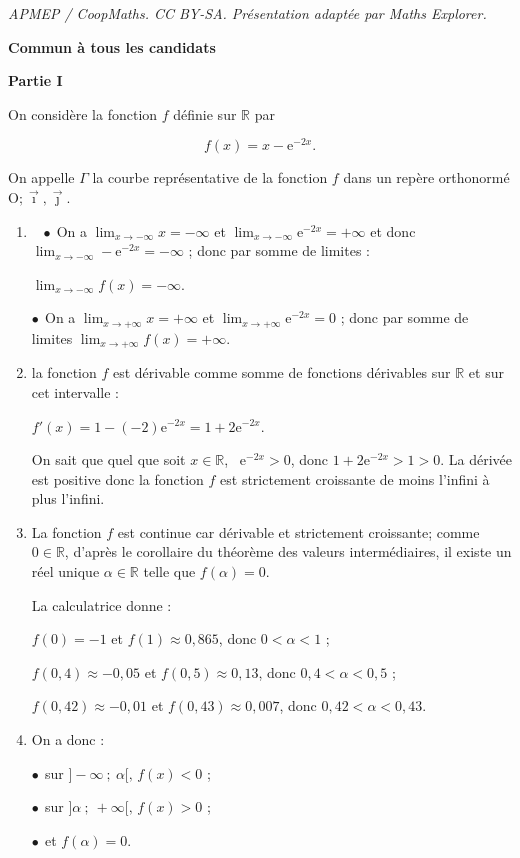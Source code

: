 \documentclass[10pt]{article}
\providecommand{\R}{\mathbb{R}}
\providecommand{\Oij}{\(\mathrm{O};\vec{\imath},\vec{\jmath}\)}
\begin{document}
\noindent\textit{APMEP / CoopMaths. CC BY-SA. Présentation adaptée par Maths Explorer.}\par\medskip
\textbf{Commun à tous les candidats}

\medskip

\begin{center}\textbf{Partie I}\end{center}

On considère la fonction $f$ définie sur $\R$ par 

\[f(x) = x - \text{e}^{-2x}.\]

On appelle $\Gamma$ la courbe représentative de la fonction $f$ dans un repère orthonormé \Oij.

\medskip

\begin{enumerate}
\item ~
$\bullet~~$On a $\displaystyle\lim_{x \to - \infty} x = - \infty$ et $\displaystyle\lim_{x \to - \infty}\text{e}^{-2x} = + \infty$ et donc $\displaystyle\lim_{x \to - \infty}-\text{e}^{-2x} = - \infty$ ; donc par somme de limites :

$\displaystyle\lim_{x \to - \infty}f(x) = - \infty$.

$\bullet~~$On a $\displaystyle\lim_{x \to + \infty} x  = + \infty$ et $\displaystyle\lim_{x \to + \infty}\text{e}^{-2x} = 0$ ; donc par somme de limites  $\displaystyle\lim_{x \to + \infty}f(x) = + \infty$.
\item 
la fonction $f$ est dérivable comme somme de fonctions dérivables sur $\R$ et sur cet intervalle :

$f'(x) = 1 - (- 2)\text{e}^{-2x} = 1 + 2\text{e}^{-2x}$.

On sait que quel que soit $x \in \R$, \, $\text{e}^{-2x} > 0$, donc $ 1 + 2\text{e}^{-2x} > 1 > 0$.
La dérivée est positive donc la fonction $f$ est strictement croissante de moins l'infini à plus l'infini.
\item 
La fonction $f$ est continue car dérivable et strictement croissante; comme $0 \in \R$, d'après le corollaire du théorème des valeurs intermédiaires, il existe un réel unique $\alpha \in \R$ telle que $f(\alpha) = 0$.

La calculatrice donne  :

$f(0) = - 1$ et $f(1) \approx 0,865$, donc $0 < \alpha < 1$ ;

$f(0,4) \approx - 0,05$ et $f(0,5) \approx 0,13$, donc $0,4 < \alpha < 0,5$ ;

$f(0,42) \approx - 0,01$ et $f(0,43) \approx 0,007$, donc $0,42 < \alpha < 0,43$.
\item 
On a donc :

$\bullet~~$sur $]- \infty~;~\alpha[, \, f(x) < 0$ ;

$\bullet~~$sur $]\alpha~;~+ \infty[, \, f(x) > 0$ ;

$\bullet~~$et $f(\alpha) = 0$.
\end{enumerate}
\end{document}
